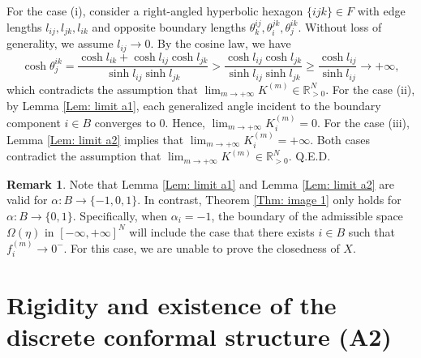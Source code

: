 \documentclass[12pt]{amsart}
\theoremstyle{definition}
\newtheorem{remark}[theorem]{Remark}
\def\qed{\hfill{Q.E.D.}\smallskip}
\begin{document}
For the case (i), consider a right-angled hyperbolic hexagon $\{ijk\}\in F$ with edge lengths $l_{ij},l_{jk},l_{ik}$ and opposite boundary lengths $\theta^{ij}_k,\theta^{jk}_i,\theta^{ik}_j$.
Without loss of generality, we assume $l_{ij}\rightarrow 0$. By the cosine law, we have
\begin{equation*}
\cosh \theta^{ik}_j=\frac{\cosh l_{ik}+\cosh l_{ij}\cosh l_{jk}}{\sinh l_{ij}\sinh l_{jk}}>\frac{\cosh l_{ij}\cosh l_{jk}}{\sinh l_{ij}\sinh l_{jk}}\geq\frac{\cosh l_{ij}}{\sinh l_{ij}}\rightarrow +\infty,
\end{equation*}
which contradicts the assumption that $\lim_{m\rightarrow +\infty}K^{(m)}\in \mathbb{R}^N_{>0}$.
For the case (ii), by Lemma \ref{Lem: limit a1}, each generalized angle incident to the boundary component $i\in B$ converges to 0.
Hence, $\lim_{m\rightarrow +\infty}K_i^{(m)}=0$.
For the case (iii), Lemma \ref{Lem: limit a2} implies that $\lim_{m\rightarrow +\infty}K_i^{(m)}=+\infty$.
Both cases contradict the assumption that $\lim_{m\rightarrow +\infty}K^{(m)}\in \mathbb{R}^N_{>0}$.
\qed

\begin{remark}
Note that Lemma \ref{Lem: limit a1} and Lemma \ref{Lem: limit a2} are valid for $\alpha: B\rightarrow \{-1,0,1\}$.
In contrast, Theorem \ref{Thm: image 1} only holds for $\alpha: B\rightarrow \{0,1\}$.
Specifically, when $\alpha_i=-1$, the boundary of the admissible space $\Omega(\eta)$ in $[-\infty,+\infty]^N$ will include the case that
there exists $i\in B$ such that $f_i^{(m)}\rightarrow 0^-$.
For this case, we are unable to prove the closedness of $X$.
\end{remark}

\section{Rigidity and existence of the discrete conformal structure (A2)}\label{section A2}
\end{document}
